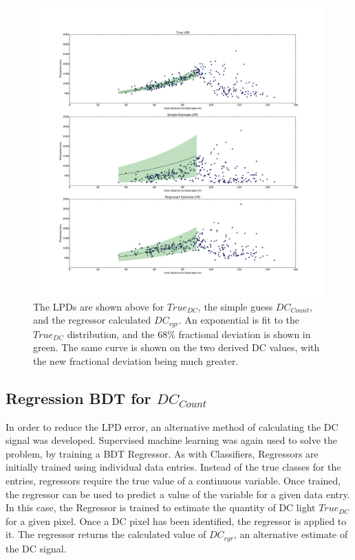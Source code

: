 \documentclass{article}
\begin{document}
\begin{figure}
\begin{center}
\includegraphics[width=\textwidth]{corsikalpd1}
\caption{The LPDs are shown above for $True_{DC}$, the simple guess $DC_{Count}$, and the regressor calculated $DC_{rgr}$. An exponential is fit to the $True_{DC}$ distribution, and the 68\% fractional deviation is shown in green. The same curve is shown on the two derived DC values, with the new fractional deviation being much greater.}
\label{fig:corsikalpd}
\end{center}
\end{figure}

\subsection{Regression BDT for $DC_{Count}$}
In order to reduce the LPD error, an alternative method of calculating the DC signal was developed. Supervised machine learning was again used to solve the problem, by training a BDT Regressor. As with Classifiers, Regressors are initially trained using individual data entries. Instead of the true classes for the entries, regressors require the true value of a continuous variable. Once trained, the regressor can be used to predict a value of the variable for a given data entry. In this case, the Regressor is trained to estimate the quantity of DC light $True_{DC}$ for a given pixel. Once a DC pixel has been identified, the regressor is applied to it. The regressor returns the calculated value of $DC_{rgr}$, an alternative estimate of the DC signal. 
\end{document}

